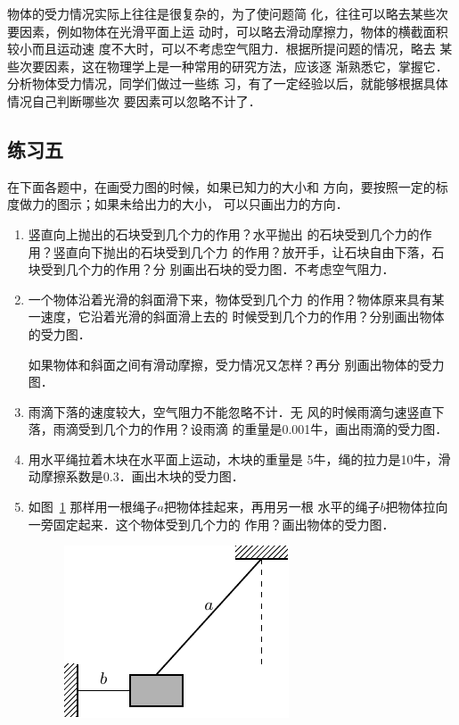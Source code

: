     物体的受力情况实际上往往是很复杂的，为了使问题简
化，往往可以略去某些次要因素，例如物体在光滑平面上运
动时，可以略去滑动摩擦力，物体的横截面积较小而且运动速
度不大时，可以不考虑空气阻力．根据所提问题的情况，略去
某些次要因素，这在物理学上是一种常用的研究方法，应该逐
渐熟悉它，掌握它．
分析物体受力情况，同学们做过一些练
习，有了一定经验以后，就能够根据具体情况自己判断哪些次
要因素可以忽略不计了．

\subsection*{练习五} 
    在下面各题中，在画受力图的时候，如果已知力的大小和
方向，要按照一定的标度做力的图示；如果未给出力的大小，
可以只画出力的方向．
\begin{enumerate} 
\item 竖直向上抛出的石块受到几个力的作用？水平抛出
的石块受到几个力的作用？竖直向下抛出的石块受到几个力
的作用？放开手，让石块自由下落，石块受到几个力的作用？分
别画出石块的受力图．不考虑空气阻力．

\item 一个物体沿着光滑的斜面滑下来，物体受到几个力
的作用？物体原来具有某一速度，它沿着光滑的斜面滑上去的
时候受到几个力的作用？分别画出物体的受力图．

    如果物体和斜面之间有滑动摩擦，受力情况又怎样？再分
别画出物体的受力图．

\item 雨滴下落的速度较大，空气阻力不能忽略不计．无
风的时候雨滴匀速竖直下落，雨滴受到几个力的作用？设雨滴
的重量是0.001牛，画出雨滴的受力图．

\item 用水平绳拉着木块在水平面上运动，木块的重量是
5牛，绳的拉力是10牛，滑动摩擦系数是0.3．画出木块的受力图．

\item 如图~\ref{fig_A_1-21} 那样用一根绳子$a$把物体挂起来，再用另一根
水平的绳子$b$把物体拉向一旁固定起来．这个物体受到几个力的
作用？画出物体的受力图．

\begin{figure} [htp]\centering
\includegraphics{fig/A/1-21.pdf} 
\caption{} \label{fig_A_1-21} 
\end{figure} 


\end{enumerate}
